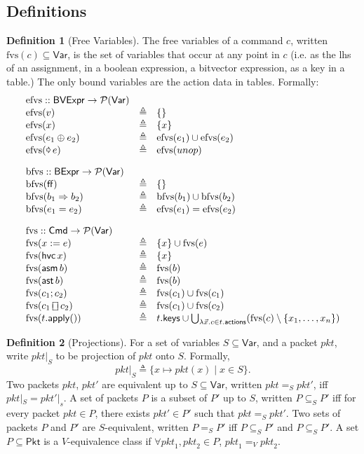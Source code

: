\documentclass{article}
\newcommand{\pkt}{\mathit{pkt}}
\newcommand{\FALSE}{\mathsf{ff}}
\newcommand{\binop}{\mathbin{\oplus}}
\newcommand{\unop}{\mathop{\text{\pointer}}}
\newcommand{\BVExpr}{\mathsf{BVExpr}}
\newcommand{\BExpr}{\mathsf{BExpr}}
\newcommand{\Cmd}{\mathsf{Cmd}}
\newcommand{\Pkt}{\mathsf{Pkt}}
\newcommand{\Var}{\mathsf{Var}}
\newcommand{\actions}{\mathsf{actions}}
\newcommand{\keys}{\mathsf{keys}}
\newcommand{\assert}{\mathop{\mathsf{ast}}}
\newcommand{\assume}{\mathop{\mathsf{asm}}}
\newcommand{\apply}{\mathsf{apply}}
\newcommand{\choiceop}{\rotatebox[origin=c]{90}{$\sqsubset\!\!\!\sqsupset$}}
\newcommand{\choice}{\mathbin{\choiceop}}
\newcommand{\havoc}[1]{\mathop{\mathsf{hvc}}#1}
\newcommand{\fvs}{\textrm{fvs}}
\newcommand{\efvs}{\textrm{efvs}}
\newcommand{\bfvs}{\textrm{bfvs}}
\theoremstyle{plain}
\theoremstyle{definition}
\newtheorem{definition}{Definition}
\theoremstyle{remark}
\begin{document}
\subsection{Definitions}

\begin{definition}[Free Variables]
  The free variables of a command $c$, written $\fvs(c) \subseteq \Var$, is the
  set of variables that occur at any point in $c$ (i.e. as the lhs of an
  assignment, in a boolean expression, a bitvector expression, as a key in a
  table.) The only bound variables are the action data in tables. Formally:
  \[\begin{array}{l >{\triangleq}cl}
  \efvs :: \BVExpr \to \mathcal{P}(\Var) \\
  \efvs(v) && \{\} \\
  \efvs(x) && \{x\}\\
  \efvs(e_1 \binop e_2) && \efvs(e_1) \cup \efvs(e_2)\\
  \efvs(\unop e) && \efvs(unop) \\[1em]
  \bfvs :: \BExpr \to \mathcal{P}(\Var) \\
  \bfvs(\FALSE) && \{\}\\
  \bfvs(b_1 \Rightarrow b_2) && \bfvs(b_1) \cup \bfvs(b_2)\\
  \bfvs(e_1 = e_2) && \efvs(e_1) = \efvs(e_2) \\[1em]
  \fvs :: \Cmd \to \mathcal{P}(\Var) \\
  \fvs(x := e) && \{x\} \cup \fvs(e)\\
  \fvs(\havoc x) && \{x\}\\
  \fvs(\assume b) && \fvs(b)\\
  \fvs(\assert b) && \fvs(b) \\
  \fvs(c_1;c_2) && \fvs(c_1) \cup \fvs(c_1) \\
  \fvs(c_1 \choice c_2) && \fvs(c_1) \cup \fvs(c_2) \\
  \fvs(t.\apply()) &&
  t.\keys \cup \bigcup_{\lambda \vec x. c \in t.\actions} (\fvs(c) \setminus \{x_1,\ldots, x_n\})
  \end{array}\]
\end{definition}



\begin{definition}[Projections]
  For a set of variables $S \subseteq \Var$, and a packet $\pkt$, write
  $\pkt|_S$ to be projection of $\pkt$ onto $S$.  Formally,
  \[\pkt|_S \triangleq \{x \mapsto \pkt(x) \mid x \in S\}.\]
  Two packets $\pkt$, $\pkt'$ are equivalent up to $S \subseteq \Var$, written
  $\pkt =_S \pkt'$, iff $\pkt|_S = \pkt'|_s$. A set of packets $P$ is a subset
  of $P'$ up to $S$, written $P \subseteq_S P'$ iff for every packet $\pkt \in
  P$, there exists $\pkt' \in P'$ such that $\pkt =_S \pkt'$. Two sets of
  packets $P$ and $P'$ are $S$-equivalent, written $P =_S P'$ iff $P \subseteq_S
  P'$ and $P \subseteq_S P'$. A set $P \subseteq \Pkt$ is a $V$-equivalence
  class if $\forall \pkt_1, \pkt_2 \in P$, $\pkt_1 =_V \pkt_2$.
\end{definition}
\end{document}
